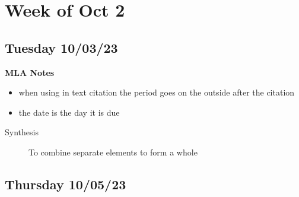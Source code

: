 \documentclass[12pt]{article}
\begin{document}
    \tableofcontents \newpage
    \section{Week of Oct 2}
        \subsection{Tuesday 10/03/23}           
            
            \textbf{MLA Notes}
                \begin{itemize}
                    \item when using in text citation the period goes on the outside after the citation
                    \item the date is the day it is due
                \end{itemize}

            \bigskip
            \begin{description}
                \item[Synthesis] To combine separate elements to form a whole
            \end{description}
            
        \subsection{Thursday 10/05/23}
            


\end{document}

